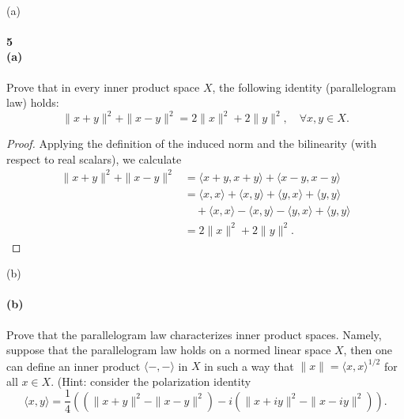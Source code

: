 \documentclass[12pt]{article}
\newlength{\myparskip}
\newenvironment{fullbox}{\begin{lrbox}{\savefullbox}\begin{minipage}{\dimexpr\textwidth-2\fboxsep\relax}\setlength{\parskip}{\myparskip}}{\end{minipage}\end{lrbox}\framebox[\textwidth]{\usebox{\savefullbox}}}
\newenvironment{pbox}[1][]{\begin{fullbox}\ifx#1\empty\else\paragraph{#1}\phantom{}\fi}{\end{fullbox}}
\theoremstyle{definition}
\newcommand{\<}{\langle}
\renewcommand{\>}{\rangle}
\begin{document}
\newpage
\begin{pbox}[5 \\ (a)]
    Prove that in every inner product space $X$, the following identity (parallelogram law) holds:
    \[
        \|x + y\|^2 + \|x - y\|^2 = 2\|x\|^2 + 2\|y\|^2, \quad \forall x, y \in X.
    \] 
\end{pbox}

\begin{proof}
    Applying the definition of the induced norm and the bilinearity (with respect to real scalars), we calculate
    \begin{align*}
        \|x + y\|^2 + \|x - y\|^2
            &= \<x + y, x + y\> + \<x - y, x - y\> \\
            &= \<x, x\> + \<x, y\> + \<y, x\> + \<y, y\> \\
            &\quad + \<x, x\> - \<x, y\> - \<y, x\> + \<y, y\> \\
            &= 2\|x\|^2 + 2\|y\|^2.
    \end{align*}
\end{proof}



\newpage
\begin{pbox}[(b)]
    Prove that the parallelogram law characterizes inner product spaces.
    Namely, suppose that the parallelogram law holds on a normed linear space $X$, then one can define an inner product $\<-, -\>$ in $X$ in such a way that $\|x\| = \<x, x\>^{1/2}$ for all $x \in X$.
    (Hint: consider the polarization identity
    \[
        \<x, y\> = \frac{1}{4}\left((\|x + y\|^2 - \|x - y\|^2) - i(\|x + iy\|^2 - \|x - iy\|^2)\right).
    \]
\end{pbox}
\end{document}

